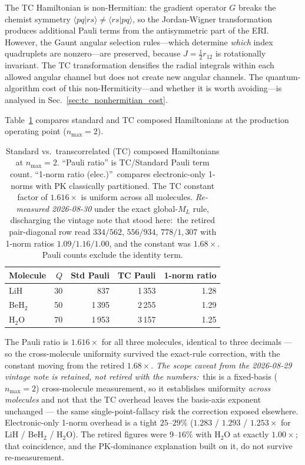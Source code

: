 \documentclass[aps,pra,twocolumn,superscriptaddress,longbibliography]{revtex4-2}
\begin{document}
The TC Hamiltonian is non-Hermitian: the gradient operator $G$ breaks
the chemist symmetry $\langle pq|rs\rangle \ne \langle rs|pq\rangle$,
so the Jordan-Wigner transformation produces additional Pauli terms
from the antisymmetric part of the ERI.  However, the Gaunt angular
selection rules---which determine \emph{which} index quadruplets are
nonzero---are preserved, because $J = \tfrac{1}{2}r_{12}$ is
rotationally invariant.  The TC transformation densifies the radial
integrals within each allowed angular channel but does not create
new angular channels.  The quantum-algorithm cost of this
non-Hermiticity---and whether it is worth avoiding---is analysed in
Sec.~\ref{sec:tc_nonhermitian_cost}.

Table~\ref{tab:tc_composed} compares standard and TC composed
Hamiltonians at the production operating point ($n_{\max} = 2$).

\begin{table}[t]
\caption{Standard vs.\ transcorrelated (TC) composed Hamiltonians
at $n_{\max} = 2$.  ``Pauli ratio'' is TC/Standard Pauli term count.
``1-norm ratio (elec.)''\ compares electronic-only 1-norms with PK
classically partitioned.  The TC constant factor of $1.616\times$ is
uniform across all molecules.  \emph{Re-measured 2026-08-30} under the
exact global-$M_L$ rule, discharging the vintage note that stood here:\
the retired pair-diagonal row read $334/562$, $556/934$, $778/1{,}307$
with 1-norm ratios $1.09/1.16/1.00$, and the constant was $1.68\times$.
Pauli counts exclude the identity term.}
\label{tab:tc_composed}
\begin{ruledtabular}
\begin{tabular}{lrrrr}
Molecule & $Q$ & {Std Pauli} & {TC Pauli}
  & {1-norm ratio} \\
\hline
LiH    &  30 &    837 & 1\,353 & 1.28 \\
BeH$_2$ &  50 & 1\,395 & 2\,255 & 1.29 \\
H$_2$O  &  70 & 1\,953 & 3\,157 & 1.25 \\
\end{tabular}
\end{ruledtabular}
\end{table}

The Pauli ratio is $1.616\times$ for all three molecules, identical to
three decimals --- so the cross-molecule uniformity survived the exact-rule
correction, with the constant moving from the retired $1.68\times$.
\emph{The scope caveat from the 2026-08-29 vintage note is retained, not
retired with the numbers:}\ this is a fixed-basis ($n_{\max} = 2$)
cross-molecule measurement, so it establishes uniformity \emph{across
molecules} and not that the TC overhead leaves the basis-axis exponent
unchanged --- the same single-point-fallacy risk the correction exposed
elsewhere.  Electronic-only 1-norm overhead is a tight $25$--$29\%$
($1.283$ / $1.293$ / $1.253\times$ for LiH / BeH$_2$ / H$_2$O).  The
retired figures were $9$--$16\%$ with H$_2$O at exactly $1.00\times$;
that coincidence, and the PK-dominance explanation built on it, do not
survive re-measurement.
\end{document}
